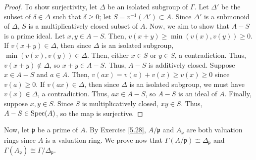 \begin{proof}
To show surjectivity, let $\Delta$ be an isolated subgroup of $\Gamma$. Let $\Delta'$ be the subset of $\delta \in \Delta$ such that $\delta \ge 0$; let $S = v^{-1}(\Delta') \subset A$.
Since $\Delta'$ is a submonoid of $\Delta$, $S$ is a multiplicatively closed subset of $A$. Now, we aim to show that $A - S$ is a prime ideal. Let $x,y \in A - S$. Then,
$v(x+y) \ge \min(v(x),v(y)) \ge 0$. If $v(x+y) \in \Delta$, then since $\Delta$ is an isolated subgroup, $\min(v(x),v(y)) \in \Delta$. Then, either $x \in S$ or $y \in S$,
a contradiction. Thus, $v(x+y) \not\in \Delta$, so $x+y \in A - S$. Thus, $A - S$ is additively closed. Suppose $x \in A - S$ and $a \in A$. Then, $v(ax) = v(a) + v(x) \ge v(x) \ge 0$
since $v(a) \ge 0$. If $v(ax) \in \Delta$, then since $\Delta$ is an isolated subgroup, we must have $v(x) \in \Delta$, a contradiction. Thus, $ax \in A - S$, so $A - S$ is an ideal
of $A$. Finally, suppose $x,y \in S$. Since $S$ is multiplicatively closed, $xy \in S$. Thus, $A - S \in \operatorname{Spec}(A)$, so the map is surjective.
\end{proof}

Now, let $\mathfrak{p}$ be a prime of $A$. By Exercise \ref{5.28}, $A/\mathfrak{p}$ and $A_{\mathfrak{p}}$ are both valuation rings since $A$ is a valuation ring.
We prove now that $\Gamma(A/\mathfrak{p}) \cong \Delta_{\mathfrak{p}}$ and $\Gamma(A_{\mathfrak{p}}) \cong \Gamma/\Delta_{\mathfrak{p}}$.


